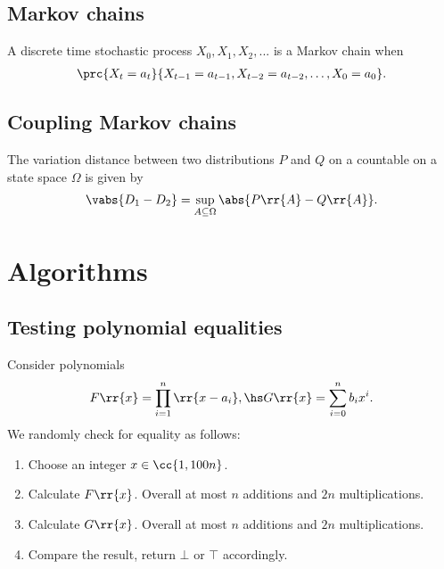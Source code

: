 \documentclass{article}
\begin{document}
\subsection{Markov chains}

\begin{definition}
  A discrete time stochastic process $X_0,X_1,X_2,...$ is a Markov chain when
  \begin{align*}
    \prc{X_t=a_t}{X_{t-1}=a_{t-1},X_{t-2}=a_{t-2},\ldots,X_0=a_0}.
  \end{align*}
\end{definition}

\subsection{Coupling Markov chains}

\begin{definition}
  The variation distance between two distributions $P$ and $Q$ on a countable
  on a state space $\Omega$ is given by
  \begin{align*}
    \vabs{D_1-D_2}=\sup_{A\subseteq\Omega} \abs{P\rr{A}-Q\rr{A}}.
  \end{align*}
\end{definition}

\section{Algorithms}
\label{sec:algorithms}

\subsection{Testing polynomial equalities}

\begin{algorithm}\label{alg:stan-ulman}
  Consider polynomials
  \begin{align*}
    F \rr{ x } = \prod_{i=1}^n \rr{ x - a_i }, \hs G \rr{ x } = \sum_{ i=0 }^{ n } b_i x^i.
  \end{align*}
  We randomly check for equality as follows:
  \begin{enumerate}
    \item Choose an integer $x\in \cc{ 1, 100n }$.
    \item Calculate $F \rr{ x }$. Overall at most $n$ additions and $2n$ multiplications.
    \item Calculate $G \rr{ x }$. Overall at most $n$ additions and $2n$ multiplications.
    \item Compare the result, return $\bot$ or $\top$ accordingly.
  \end{enumerate}
\end{algorithm}
\end{document}
